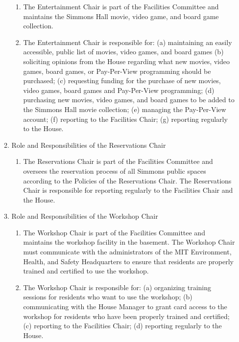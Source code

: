 \documentclass[letterpaper]{article}
\begin{document}
\begin{enumerate}
\begin{enumerate}
\begin{enumerate}

\item The Entertainment Chair is part of the Facilities Committee and maintains the Simmons Hall movie, video game, and board game collection.

\item The Entertainment Chair is responsible for: (a) maintaining an easily accessible, public list of movies, video games, and board games (b) soliciting opinions from the House regarding what new movies, video games, board games, or Pay-Per-View programming should be purchased; (c) requesting funding for the purchase of new movies, video games, board games and Pay-Per-View programming; (d) purchasing new movies, video games, and board games to be added to the Simmons Hall movie collection; (e) managing the Pay-Per-View account; (f) reporting to the Facilities Chair; (g) reporting regularly to the House.

\end{enumerate}

\item Role and Responsibilities of the Reservations Chair 

\begin{enumerate}

\item The Reservations Chair is part of the Facilities Committee and oversees the reservation process of all Simmons public spaces according to the Policies of the Reservations Chair. The Reservations Chair is responsible for reporting regularly to the Facilities Chair and the House. 

\end{enumerate}

\item Role and Responsibilities of the Workshop Chair 

\begin{enumerate}

\item The Workshop Chair is part of the Facilities Committee and maintains the workshop facility in the basement. The Workshop Chair must communicate with the administrators of the MIT Environment, Health, and Safety Headquarters to ensure that residents are properly trained and certified to use the workshop.

\item The Workshop Chair is responsible for: (a) organizing training sessions for residents who want to use the workshop; (b) communicating with the House Manager to grant card access to the workshop for residents who have been properly trained and certified; (c) reporting to the Facilities Chair; (d) reporting regularly to the House.


\end{enumerate}
\end{enumerate}
\end{enumerate}
\end{document}
